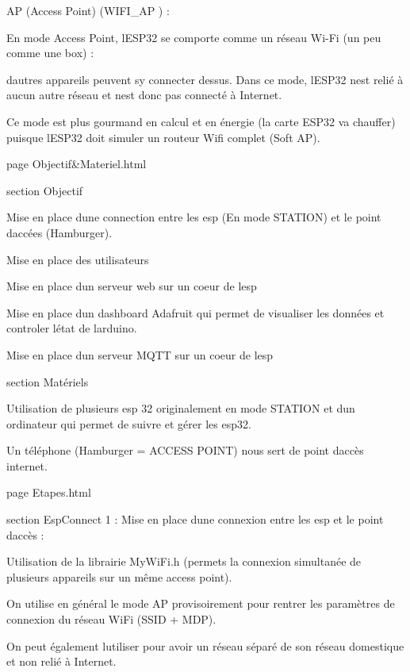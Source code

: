 AP (Access Point) (WIFI\+\_\+\+AP ) \+:
\begin{DoxyItemize}
\item En mode Access Point, l\textquotesingle{}ESP32 se comporte comme un réseau Wi-\/\+Fi (un peu comme une box) \+:
\item d\textquotesingle{}autres appareils peuvent s\textquotesingle{}y connecter dessus. Dans ce mode, l\textquotesingle{}ESP32 n\textquotesingle{}est relié à aucun autre réseau et n\textquotesingle{}est donc pas connecté à Internet.
\item Ce mode est plus gourmand en calcul et en énergie (la carte ESP32 va chauffer) puisque l\textquotesingle{}ESP32 doit simuler un routeur Wifi complet (Soft AP).
\end{DoxyItemize}

page Objectif\&Materiel.\+html

section Objectif
\begin{DoxyItemize}
\item Mise en place d\textquotesingle{}une connection entre les esp (En mode STATION) et le point d\textquotesingle{}accées (Hamburger).
\item Mise en place des utilisateurs
\item Mise en place d\textquotesingle{}un serveur web sur un coeur de l\textquotesingle{}esp
\item Mise en place d\textquotesingle{}un dashboard Adafruit qui permet de visualiser les données et controler l\textquotesingle{}état de l\textquotesingle{}arduino.
\item Mise en place d\textquotesingle{}un serveur MQTT sur un coeur de l\textquotesingle{}esp
\end{DoxyItemize}

section Matériels
\begin{DoxyItemize}
\item Utilisation de plusieurs esp 32 originalement en mode STATION et d\textquotesingle{}un ordinateur qui permet de suivre et gérer les esp32.
\item Un téléphone (Hamburger = ACCESS POINT) nous sert de point d\textquotesingle{}accès internet.
\end{DoxyItemize}

page Etapes.\+html

section Esp\+Connect 1 \+: Mise en place d\textquotesingle{}une connexion entre les esp et le point d\textquotesingle{}accès \+:
\begin{DoxyItemize}
\item Utilisation de la librairie My\+Wi\+Fi.\+h (permets la connexion simultanée de plusieurs appareils sur un même access point).
\item On utilise en général le mode AP provisoirement pour rentrer les paramètres de connexion du réseau Wi\+Fi (SSID + MDP).
\item On peut également l\textquotesingle{}utiliser pour avoir un réseau séparé de son réseau domestique et non relié à Internet.
\end{DoxyItemize}

